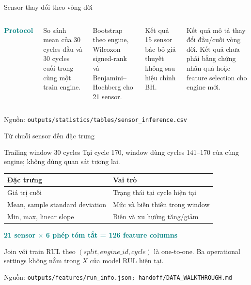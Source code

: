 \documentclass[aspectratio=169,professionalfonts]{beamer}
\newcommand{\source}[1]{\vfill\hspace{0pt}\scriptsize\color{muted}Nguồn: \nolinkurl{#1}}
\begin{document}
\begin{frame}{Sensor thay đổi theo vòng đời}
\begin{columns}[T,onlytextwidth]
\textcolor{teal}{\Large\bfseries Protocol}

So sánh mean của 30 cycles đầu và 30 cycles cuối trong cùng một train engine.

\vspace{0.35cm}
Bootstrap theo engine, Wilcoxon signed-rank và Benjamini--Hochberg cho 21 sensor.

\begin{block}{Kết quả}
15 sensor bác bỏ giả thuyết không sau hiệu chỉnh BH.
\end{block}

Kết quả mô tả thay đổi đầu/cuối vòng đời. Kết quả chưa phải bằng chứng nhân quả
hoặc feature selection cho engine mới.
\end{columns}
\source{outputs/statistics/tables/sensor_inference.csv}
\end{frame}

\begin{frame}{Từ chuỗi sensor đến đặc trưng}
\begin{block}{Trailing window 30 cycles}
Tại cycle 170, window dùng cycles 141--170 của cùng engine; không dùng quan sát tương lai.
\end{block}

\begin{table}
\centering\small
\begin{tabular}{ll}
\toprule
Đặc trưng & Vai trò\\
\midrule
Giá trị cuối & Trạng thái tại cycle hiện tại\\
Mean, sample standard deviation & Mức và biến thiên trong window\\
Min, max, linear slope & Biên và xu hướng tăng/giảm\\
\bottomrule
\end{tabular}
\end{table}

\centering
\textcolor{teal}{\Large\bfseries 21 sensor $\times$ 6 phép tóm tắt = 126 feature columns}

\small Join với train RUL theo $(split, engine\_id, cycle)$ là one-to-one.
Ba operational settings không nằm trong $X$ của model RUL hiện tại.

\source{outputs/features/run_info.json; handoff/DATA_WALKTHROUGH.md}
\end{frame}
\end{document}
